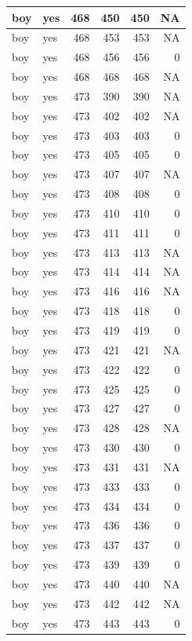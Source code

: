 \documentclass[man]{apa6}
\begin{document}
\begin{tabular}{l|l|r|r|r|r}
\hline
boy & yes & 468 & 450 & 450 & NA\\
\hline
boy & yes & 468 & 453 & 453 & NA\\
\hline
boy & yes & 468 & 456 & 456 & 0\\
\hline
boy & yes & 468 & 468 & 468 & NA\\
\hline
boy & yes & 473 & 390 & 390 & NA\\
\hline
boy & yes & 473 & 402 & 402 & NA\\
\hline
boy & yes & 473 & 403 & 403 & 0\\
\hline
boy & yes & 473 & 405 & 405 & 0\\
\hline
boy & yes & 473 & 407 & 407 & NA\\
\hline
boy & yes & 473 & 408 & 408 & 0\\
\hline
boy & yes & 473 & 410 & 410 & 0\\
\hline
boy & yes & 473 & 411 & 411 & 0\\
\hline
boy & yes & 473 & 413 & 413 & NA\\
\hline
boy & yes & 473 & 414 & 414 & NA\\
\hline
boy & yes & 473 & 416 & 416 & NA\\
\hline
boy & yes & 473 & 418 & 418 & 0\\
\hline
boy & yes & 473 & 419 & 419 & 0\\
\hline
boy & yes & 473 & 421 & 421 & NA\\
\hline
boy & yes & 473 & 422 & 422 & 0\\
\hline
boy & yes & 473 & 425 & 425 & 0\\
\hline
boy & yes & 473 & 427 & 427 & 0\\
\hline
boy & yes & 473 & 428 & 428 & NA\\
\hline
boy & yes & 473 & 430 & 430 & 0\\
\hline
boy & yes & 473 & 431 & 431 & NA\\
\hline
boy & yes & 473 & 433 & 433 & 0\\
\hline
boy & yes & 473 & 434 & 434 & 0\\
\hline
boy & yes & 473 & 436 & 436 & 0\\
\hline
boy & yes & 473 & 437 & 437 & 0\\
\hline
boy & yes & 473 & 439 & 439 & 0\\
\hline
boy & yes & 473 & 440 & 440 & NA\\
\hline
boy & yes & 473 & 442 & 442 & NA\\
\hline
boy & yes & 473 & 443 & 443 & 0\\

\end{tabular}
\end{document}
